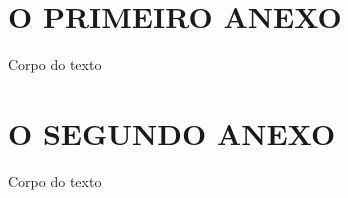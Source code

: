 \documentclass[
        oneside,      %
        english,			
        brazil			 
        ]{configcefetmglpd}
\begin{document}
\begin{anexos}

\chapter{\anexoseq O PRIMEIRO ANEXO} 

Corpo do texto



\chapter{\anexoseq O SEGUNDO ANEXO} 

Corpo do texto
  
\end{anexos}


\end{document}
